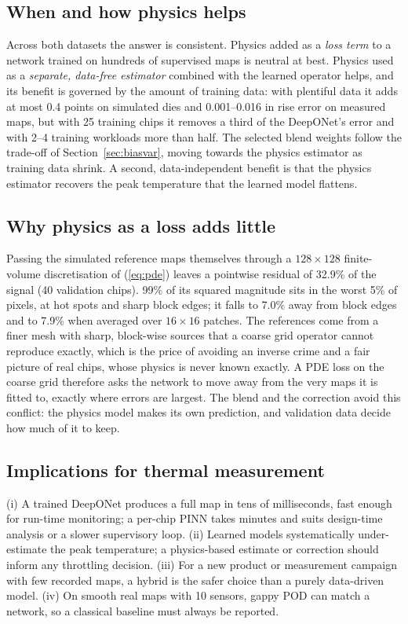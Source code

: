 \documentclass[journal]{IEEEtran}
\begin{document}
\subsection{When and how physics helps}
Across both datasets the answer is consistent.
Physics added as a \emph{loss term} to a network trained on hundreds of supervised maps is neutral at best.
Physics used as a \emph{separate, data-free estimator} combined with the learned operator helps, and its benefit is governed by the amount of training data: with plentiful data it adds at most 0.4 points on simulated dies and 0.001--0.016 in rise error on measured maps, but with 25 training chips it removes a third of the DeepONet's error and with 2--4 training workloads more than half.
The selected blend weights follow the trade-off of Section~\ref{sec:biasvar}, moving towards the physics estimator as training data shrink.
A second, data-independent benefit is that the physics estimator recovers the peak temperature that the learned model flattens.

\subsection{Why physics as a loss adds little}
Passing the simulated reference maps themselves through a $128\times128$ finite-volume discretisation of (\ref{eq:pde}) leaves a pointwise residual of 32.9\% of the signal (40 validation chips).
99\% of its squared magnitude sits in the worst 5\% of pixels, at hot spots and sharp block edges; it falls to 7.0\% away from block edges and to 7.9\% when averaged over $16\times16$ patches.
The references come from a finer mesh with sharp, block-wise sources that a coarse grid operator cannot reproduce exactly, which is the price of avoiding an inverse crime and a fair picture of real chips, whose physics is never known exactly.
A PDE loss on the coarse grid therefore asks the network to move away from the very maps it is fitted to, exactly where errors are largest.
The blend and the correction avoid this conflict: the physics model makes its own prediction, and validation data decide how much of it to keep.

\subsection{Implications for thermal measurement}
(i) A trained DeepONet produces a full map in tens of milliseconds, fast enough for run-time monitoring; a per-chip PINN takes minutes and suits design-time analysis or a slower supervisory loop.
(ii) Learned models systematically under-estimate the peak temperature; a physics-based estimate or correction should inform any throttling decision.
(iii) For a new product or measurement campaign with few recorded maps, a hybrid is the safer choice than a purely data-driven model.
(iv) On smooth real maps with 10 sensors, gappy POD can match a network, so a classical baseline must always be reported.
\end{document}
